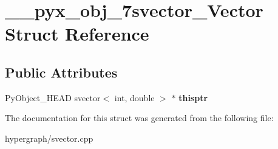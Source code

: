 \hypertarget{struct____pyx__obj__7svector__Vector}{
\section{\_\-\_\-pyx\_\-obj\_\-7svector\_\-Vector Struct Reference}
\label{struct____pyx__obj__7svector__Vector}
}
\subsection*{Public Attributes}
\begin{DoxyCompactItemize}
\item 
\hypertarget{struct____pyx__obj__7svector__Vector_a863bd79c1e19f1bcc4d8d08db9cdf5e8}{
PyObject\_\-HEAD svector$<$ int, double $>$ $\ast$ {\bfseries thisptr}}
\label{struct____pyx__obj__7svector__Vector_a863bd79c1e19f1bcc4d8d08db9cdf5e8}

\end{DoxyCompactItemize}


The documentation for this struct was generated from the following file:\begin{DoxyCompactItemize}
\item 
hypergraph/svector.cpp\end{DoxyCompactItemize}
